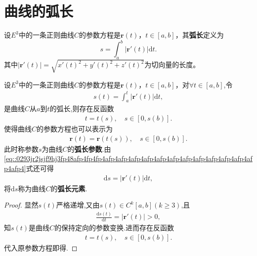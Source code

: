 \documentclass[../../main.tex]{subfiles}%
\begin{document}
\section{曲线的弧长}

\begin{definition}[曲线的弧长]
设$E^3$中的一条正则曲线$C$的参数方程是$\bm{r}(t)$，$t\in[a,b]$，其\textbf{弧长}定义为
\[
s = \int_a^b \big|\bm{r}'(t)\big|\mathrm{d}t.
\]
其中$\big|\bm{r}'(t)\big|=\sqrt{x'(t)^2+y'(t)^2+z'(t)^2}$为切向量的长度。
\end{definition}

\begin{theorem}
设$E^3$中的一条正则曲线$C$的参数方程是$\bm{r}(t)$，$t\in[a,b]$，对$\forall t\in \left[ a,b \right]$,令
\begin{align*}
s\left( t \right) =\int_a^t{\left| \bm{r}' \left( t \right) \right|\mathrm{d}t},
\end{align*}
是曲线$C$从$a$到$t$的弧长,则存在反函数
\begin{align}\label{eq::0293jr2jsjf9hj3fp48afp4fp4fp4afp4afp4afp4afp4afp4afp4afp4afp4afp4afp4afp4afp4afp4}
t=t\left( s \right),\quad s\in \left[ 0,s\left( b \right) \right].
\end{align}
使得曲线$C$的参数方程也可以表示为
\begin{align*}
\bm{r}\left( t \right) =\bm{r}\left( t\left( s \right) \right),\quad s\in \left[ 0,s\left( b \right) \right].
\end{align*}
此时称参数$s$为曲线$C$的\textbf{弧长参数}.由\eqref{eq::0293jr2jsjf9hj3fp48afp4fp4fp4afp4afp4afp4afp4afp4afp4afp4afp4afp4afp4afp4afp4afp4}式还可得
\begin{align}\label{eq:9j03jj3f0j9090u9i9i0iu3th47gh}
\mathrm{d}s=\left| \boldsymbol{r}'\left( t \right) \right|\mathrm{d}t,
\end{align}
将$\mathrm{d}s$称为曲线$C$的\textbf{弧长元素}.
\end{theorem}
\begin{proof}
显然$s\left( t \right)$严格递增,又由$s\left( t \right) \in C^k\left[ a,b \right] \left( k\geqslant 3 \right)$,且
\begin{align*}
\frac{\mathrm{d}s\left( t \right)}{\mathrm{d}t}=\left| \bm{r}' \left( t \right) \right|>0,
\end{align*}
知$s\left( t \right)$是曲线$C$的保持定向的参数变换.进而存在反函数
\begin{align*}
t=t\left( s \right),\quad s\in \left[ 0,s\left( b \right) \right].
\end{align*}
代入原参数方程即得.
\end{proof}
\end{document}
